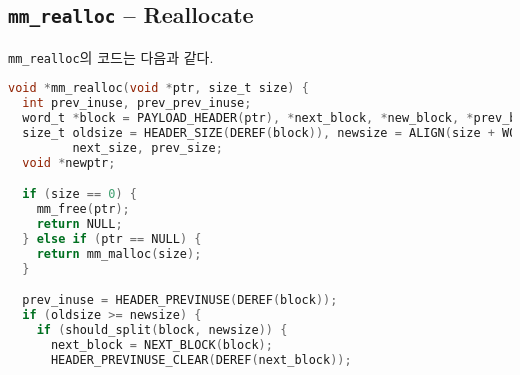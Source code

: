 \documentclass{scrartcl}
\begin{document}
\subsection{\texttt{mm\_realloc} -- Reallocate}
\texttt{mm\_realloc}의 코드는 다음과 같다.
\begin{lstlisting}[language=C]
void *mm_realloc(void *ptr, size_t size) {
  int prev_inuse, prev_prev_inuse;
  word_t *block = PAYLOAD_HEADER(ptr), *next_block, *new_block, *prev_block;
  size_t oldsize = HEADER_SIZE(DEREF(block)), newsize = ALIGN(size + WORDSIZE),
         next_size, prev_size;
  void *newptr;

  if (size == 0) {
    mm_free(ptr);
    return NULL;
  } else if (ptr == NULL) {
    return mm_malloc(size);
  }

  prev_inuse = HEADER_PREVINUSE(DEREF(block));
  if (oldsize >= newsize) {
    if (should_split(block, newsize)) {
      next_block = NEXT_BLOCK(block);
      HEADER_PREVINUSE_CLEAR(DEREF(next_block));


\end{lstlisting}
\end{document}
